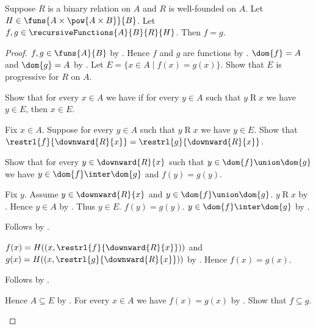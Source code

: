 \begin{theorem}\label{bounded_well_founded_recursion_unique}
    Suppose $R$ is a binary relation on $A$ and $R$ is well-founded on $A$.
    Let $H\in\funs{A\times\pow{A\times B}}{B}$.
    Let $f,g\in\recursiveFunctions{A}{B}{R}{H}$.
    Then $f=g$.
\end{theorem}
\begin{proof}
    $f,g\in\funs{A}{B}$ by .
    Hence $f$ and $g$ are functions by .
    $\dom{f}=A$ and $\dom{g}=A$ by .
    Let $E=\{x\in A\mid f(x)=g(x)\}$.
    Show that $E$ is progressive for $R$ on $A$.
    \begin{subproof}
        Show that for every $x\in A$ we have
            if for every $y\in A$ such that $y\mathrel{R}x$ we have $y\in E$,
            then $x\in E$.
        \begin{subproof}
            Fix $x\in A$.
            Suppose for every $y\in A$ such that $y\mathrel{R}x$ we have $y\in E$.
            Show that
                $\restrl{f}{\downward{R}{x}}=\restrl{g}{\downward{R}{x}}$.
            \begin{subproof}
                Show that for every $y\in\downward{R}{x}$ such that
                    $y\in\dom{f}\union\dom{g}$ we have
                    $y\in\dom{f}\inter\dom{g}$ and $f(y)=g(y)$.
                \begin{subproof}
                    Fix $y$.
                    Assume $y\in\downward{R}{x}$ and
                        $y\in\dom{f}\union\dom{g}$.
                    $y\mathrel{R}x$ by .
                    Hence $y\in A$ by .
                    Thus $y\in E$.
                    $f(y)=g(y)$.
                    $y\in\dom{f}\inter\dom{g}$ by .
                \end{subproof}
                Follows by .
            \end{subproof}
            $f(x)=H((x,\restrl{f}{\downward{R}{x}}))$ and
                $g(x)=H((x,\restrl{g}{\downward{R}{x}}))$
                by .
            Hence $f(x)=g(x)$.
        \end{subproof}
        Follows by .
    \end{subproof}
    Hence $A\subseteq E$ by .
    For every $x\in A$ we have $f(x)=g(x)$ by .
    Show that $f\subseteq g$.
    \begin{subproof}

\end{subproof}
\end{proof}
